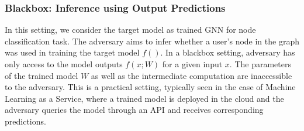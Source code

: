 \subsubsection{Blackbox: Inference using Output Predictions}

In this setting, we consider the target model as trained GNN for node classification task.
The adversary aims to infer whether a user's node in the graph was used in training the target model $f()$.
In a blackbox setting, adversary has only access to the model outputs $f(x;W)$ for a given input $x$.
The parameters of the trained model $W$ as well as the intermediate computation are inaccessible to the adversary.
This is a practical setting, typically seen in the case of Machine Learning as a Service, where a trained model is deployed in the cloud and the adversary queries the model through an API and receives corresponding predictions.


